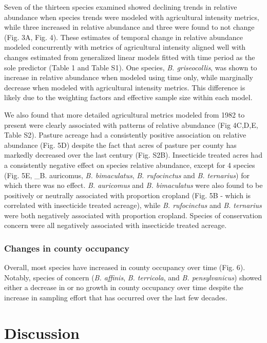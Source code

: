 \documentclass[11pt,]{article}
\begin{document}
Seven of the thirteen species examined showed declining trends in
relative abundance when species trends were modeled with agricultural
intensity metrics, while three increased in relative abundance and three
were found to not change (Fig. 3A, Fig. 4). These estimates of temporal
change in relative abundance modeled concurrently with metrics of
agricultural intensity aligned well with changes estimated from
generalized linear models fitted with time period as the sole predictor
(Table 1 and Table S1). One species, \emph{B. griseocollis}, was shown
to increase in relative abundance when modeled using time only, while
marginally decrease when modeled with agricultural intensity metrics.
This difference is likely due to the weighting factors and effective
sample size within each model.

We also found that more detailed agricultural metrics modeled from 1982
to present were clearly associated with patterns of relative abundance
(Fig 4C,D,E, Table S2). Pasture acreage had a consistently positive
association on relative abundance (Fig. 5D) despite the fact that acres
of pasture per county has markedly decreased over the last century (Fig.
S2B). Insecticide treated acres had a consistently negative effect on
species relative abundance, except for 4 species (Fig. 5E, \_B.
auricomus, \emph{B. bimaculatus}, \emph{B. rufocinctus} and \emph{B.
ternarius}) for which there was no effect. \emph{B. auricomus} and
\emph{B. bimaculatus} were also found to be positively or neutrally
associated with proportion cropland (Fig. 5B - which is correlated with
insecticide treated acreage), while \emph{B. rufocinctus} and \emph{B.
ternarius} were both negatively associated with proportion cropland.
Species of conservation concern were all negatively associated with
insecticide treated acreage.

\hypertarget{changes-in-county-occupancy}{%
\subsubsection{Changes in county
occupancy}\label{changes-in-county-occupancy}}

Overall, most species have increased in county occupancy over time (Fig.
6). Notably, species of concern (\emph{B. affinis}, \emph{B. terricola},
and \emph{B. pensylvanicus}) showed either a decrease in or no growth in
county occupancy over time despite the increase in sampling effort that
has occurred over the last few decades.

\hypertarget{discussion}{%
\section{Discussion}\label{discussion}}
\end{document}
